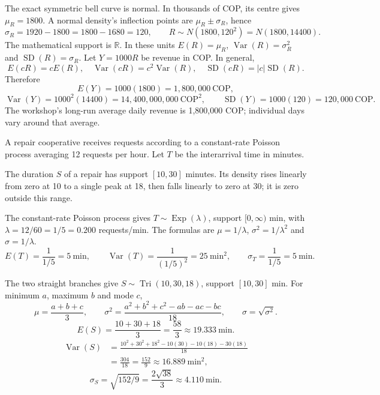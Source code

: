 The exact symmetric bell curve is normal. In thousands of COP, its centre gives $\mu_R=1800$.
A normal density's inflection points are $\mu_R\pm\sigma_R$, hence
\[\sigma_R=1920-1800=1800-1680=120,\qquad R\sim N(1800,120^2)=N(1800,14400).\]
The mathematical support is $\mathbb R$. In these units $E(R)=\mu_R$, $\operatorname{Var}(R)=\sigma_R^2$ and $\operatorname{SD}(R)=\sigma_R$.
Let $Y=1000R$ be revenue in COP. In general,
\[E(cR)=cE(R),\quad\operatorname{Var}(cR)=c^2\operatorname{Var}(R),\quad\operatorname{SD}(cR)=|c|\operatorname{SD}(R).\]
Therefore
\[E(Y)=1000(1800)=1{,}800{,}000\ \text{COP},\]
\[\operatorname{Var}(Y)=1000^2(14400)=14{,}400{,}000{,}000\ \text{COP}^2,\qquad
\operatorname{SD}(Y)=1000(120)=120{,}000\ \text{COP}.\]
The workshop's long-run average daily revenue is 1,800,000 COP; individual days vary around that average.

A repair cooperative receives requests according to a constant-rate Poisson process averaging 12 requests per hour. Let $T$ be the interarrival time in minutes.

The duration $S$ of a repair has support $[10,30]$ minutes. Its density rises linearly from zero at 10 to a single peak at 18, then falls linearly to zero at 30; it is zero outside this range.


The constant-rate Poisson process gives $T\sim\operatorname{Exp}(\lambda)$, support $[0,\infty)$ min,
with $\lambda=12/60=1/5=0.200$ requests/min.
The formulas are $\mu=1/\lambda$, $\sigma^2=1/\lambda^2$ and $\sigma=1/\lambda$.
\[E(T)=\frac1{1/5}=5\ \text{min},\qquad
\operatorname{Var}(T)=\frac1{(1/5)^2}=25\ \text{min}^2,\qquad
\sigma_T=\frac1{1/5}=5\ \text{min}.\]

The two straight branches give $S\sim\operatorname{Tri}(10,30,18)$, support $[10,30]$ min.
For minimum $a$, maximum $b$ and mode $c$,
\[\mu=\frac{a+b+c}{3},\qquad
\sigma^2=\frac{a^2+b^2+c^2-ab-ac-bc}{18},\qquad\sigma=\sqrt{\sigma^2}.\]
\[E(S)=\frac{10+30+18}{3}=\frac{58}{3}\approx19.333\ \text{min}.\]
\[\begin{aligned}\operatorname{Var}(S)
&=\frac{10^2+30^2+18^2-10(30)-10(18)-30(18)}{18}\\
&=\frac{304}{18}=\frac{152}{9}\approx16.889\ \text{min}^2,\end{aligned}\]
\[\sigma_S=\sqrt{152/9}=\frac{2\sqrt{38}}3\approx4.110\ \text{min}.\]

